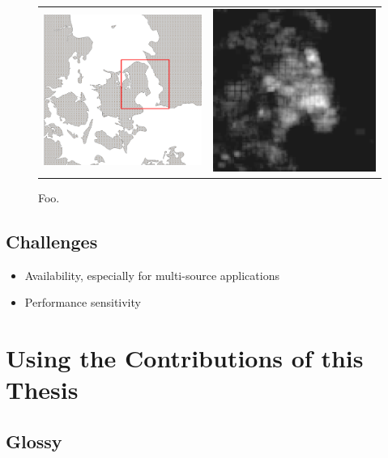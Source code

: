 \documentclass[11pt, oneside]{report}
\begin{document}
\begin{figure}[tb]
  \begin{center}
    \begin{tabular}{cc}
      \includegraphics[width=0.4\linewidth]{./figs-thesis/heat_extent.png} & \includegraphics[width=0.383\linewidth]{./figs-thesis/tileheat_heatmap_sjaelland.png} \\
    \end{tabular}
    \caption{Foo.}
    \label{case:study:heat:map}
  \end{center}
\end{figure}

\subsection{Challenges}
\begin{itemize}
\item Availability, especially for multi-source applications
\item Performance sensitivity
\end{itemize}	

\section{Using the Contributions of this Thesis}

\subsection{Glossy}
\end{document}
